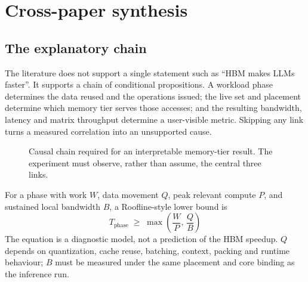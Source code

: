 \section{Cross-paper synthesis}
\label{sec:synthesis}

\subsection{The explanatory chain}

The literature does not support a single statement such as ``HBM makes
LLMs faster''.  It supports a chain of conditional propositions.  A
workload phase determines the data reused and the operations issued;
the live set and placement determine which memory tier serves those
accesses; and the resulting bandwidth, latency and matrix throughput
determine a user-visible metric.  Skipping any link turns a measured
correlation into an unsupported cause.

\begin{figure}[htbp]
\centering
{}
\caption{Causal chain required for an interpretable memory-tier result.
The experiment must observe, rather than assume, the central three
links.}
\label{fig:causal-chain}
\end{figure}

For a phase with work \(W\), data movement \(Q\), peak relevant compute
\(P\), and sustained local bandwidth \(B\), a Roofline-style lower bound
is~\cite{williams2009roofline}
\[
  T_{\mathrm{phase}} \;\ge\;
  \max\!\left(\frac{W}{P},\,\frac{Q}{B}\right)
\]
The equation is a diagnostic model, not
a prediction of the HBM speedup.  \(Q\) depends on quantization, cache
reuse, batching, context, packing and runtime behaviour; \(B\) must be
measured under the same placement and core binding as the inference
run.

